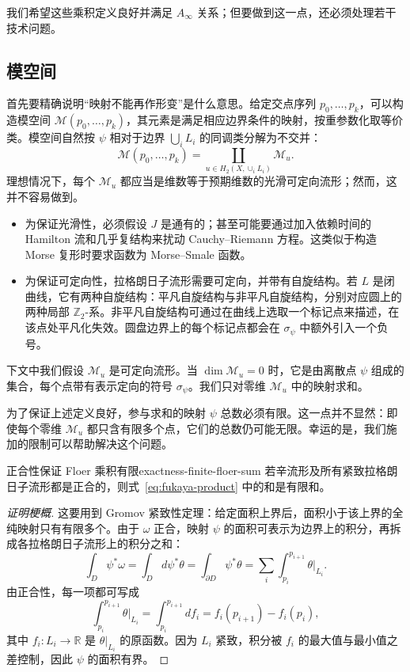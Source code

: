 我们希望这些乘积定义良好并满足 $A_\infty$ 关系；但要做到这一点，还必须处理若干技术问题。

\subsection{模空间}\label{subsec:fukaya-moduli-spaces}
首先要精确说明“映射不能再作形变”是什么意思。给定交点序列 $p_0,\ldots,p_k$，可以构造模空间 $\mathcal M(p_0,\ldots,p_k)$，其元素是满足相应边界条件的映射，按重参数化取等价类。模空间自然按 $\psi$ 相对于边界 $\bigcup_iL_i$ 的同调类分解为不交并：
\[
  \mathcal M(p_0,\ldots,p_k)=
  \coprod_{u\in H_2(X,\cup_iL_i)}\mathcal M_u.
\]
理想情况下，每个 $\mathcal M_u$ 都应当是维数等于预期维数的光滑可定向流形；然而，这并不容易做到。
\begin{itemize}
  \item 为保证光滑性，必须假设 $J$ 是通有的；甚至可能要通过加入依赖时间的 Hamilton 流和几乎复结构来扰动 Cauchy--Riemann 方程。这类似于构造 Morse 复形时要求函数为 Morse--Smale 函数。
  \item 为保证可定向性，拉格朗日子流形需要可定向，并带有自旋结构。若 $L$ 是闭曲线，它有两种自旋结构：平凡自旋结构与非平凡自旋结构，分别对应圆上的两种局部 $\mathbb Z_2$-系。非平凡自旋结构可通过在曲线上选取一个标记点来描述，在该点处平凡化失效。圆盘边界上的每个标记点都会在 $\sigma_\psi$ 中额外引入一个负号。
\end{itemize}

下文中我们假设 $\mathcal M_u$ 是可定向流形。当 $\dim\mathcal M_u=0$ 时，它是由离散点 $\psi$ 组成的集合，每个点带有表示定向的符号 $\sigma_\psi$。我们只对零维 $\mathcal M_u$ 中的映射求和。

为了保证上述定义良好，参与求和的映射 $\psi$ 总数必须有限。这一点并不显然：即使每个零维 $\mathcal M_u$ 都只含有限多个点，它们的总数仍可能无限。幸运的是，我们施加的限制可以帮助解决这个问题。

\begin{lemma}{正合性保证 Floer 乘积有限}{exactness-finite-floer-sum}
若辛流形及所有紧致拉格朗日子流形都是正合的，则式~\eqref{eq:fukaya-product} 中的和是有限和。
\end{lemma}
\begin{proof}[证明梗概]
这要用到 Gromov 紧致性定理：给定面积上界后，面积小于该上界的全纯映射只有有限多个。由于 $\omega$ 正合，映射 $\psi$ 的面积可表示为边界上的积分，再拆成各拉格朗日子流形上的积分之和：
\[
  \int_D\psi^*\omega=\int_Dd\psi^*\theta
  =\int_{\partial D}\psi^*\theta
  =\sum_i\int_{p_i}^{p_{i+1}}\theta|_{L_i}.
\]
由正合性，每一项都可写成
\[
  \int_{p_i}^{p_{i+1}}\theta|_{L_i}
  =\int_{p_i}^{p_{i+1}}df_i=f_i(p_{i+1})-f_i(p_i),
\]
其中 $f_i\colon L_i\to\mathbb R$ 是 $\theta|_{L_i}$ 的原函数。因为 $L_i$ 紧致，积分被 $f_i$ 的最大值与最小值之差控制，因此 $\psi$ 的面积有界。
\end{proof}


